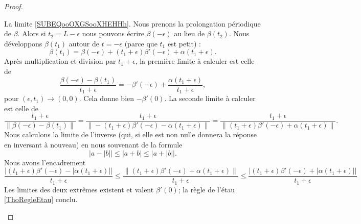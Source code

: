 \begin{proof}
\begin{subproof}
        La limite \eqref{SUBEQooOXGSooXHEHHh}. Nous prenons la prolongation périodique de \( \beta\). Alors si \( t_2=L-\epsilon\) nous pouvons écrire \( \beta(-\epsilon)\) au lieu de \( \beta(t_2)\). Nous développons \( \beta(t_1)\) autour de \( t=-\epsilon\) (parce que \( t_1\) est petit) :
        \begin{equation}
            \beta(t_1)=\beta(-\epsilon)+(t_1+\epsilon)\beta'(-\epsilon)+\alpha(t_1+\epsilon).
        \end{equation}
        Après multiplication et division par \( t_1+\epsilon\), la première limite à calculer est celle de
        \begin{equation}
            \frac{ \beta(-\epsilon)-\beta(t_1) }{ t_1+\epsilon }=-\beta'(-\epsilon)+\frac{ \alpha(t_1+\epsilon) }{ t_1+\epsilon },
        \end{equation}
        pour \( (\epsilon,t_1)\to (0,0)\). Cela donne bien \( -\beta'(0)\). La seconde limite à calculer est celle de
        \begin{equation}
            \frac{ t_1+\epsilon }{ \| \beta(-\epsilon)-\beta(t_1) \| }=\frac{ t_1+\epsilon }{ \| -(t_1+\epsilon)\beta'(-\epsilon)-\alpha(t_1+\epsilon) \| }=\frac{ t_1+\epsilon }{ \| (t_1+\epsilon)\beta'(-\epsilon)+\alpha(t_1+\epsilon) \| }.
        \end{equation}
        Nous calculons la limite de l'inverse (qui, si elle est non nulle donnera la réponse en inversant à nouveau) en nous souvenant de la formule
        \begin{equation}
           \big|  a-| b | \big|  \leq | a+b |\leq \big|    a+| b |\big|.
        \end{equation}
        Nous avons l'encadrement
        \begin{equation}
            \frac{  \big| (t_1+\epsilon)\beta'(-\epsilon)-| \alpha(t_1+\epsilon) | \big| }{ t_1+\epsilon }\leq \frac{ \|  (t_1+\epsilon)\beta'(-\epsilon)+ \alpha(t_1+\epsilon) \|  }{ t_1+\epsilon }\leq  \frac{ \big|   (t_1+\epsilon)\beta'(-\epsilon)+| \alpha(t_1+\epsilon) | \big| }{ t_1+\epsilon }
        \end{equation}
        Les limites des deux extrêmes existent et valent \( \beta'(0)\); la règle de l'étau \ref{ThoRegleEtau} conclu.


\end{subproof}
\end{proof}
